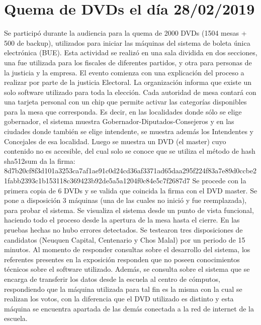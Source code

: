 \section{Quema de DVDs el día 28/02/2019}
Se participó durante la audiencia para la quema de 2000 DVDs (1504 mesas + 500 de backup), utilizados para iniciar las máquinas del sistema de boleta única electrónica (BUE). \newline
Esta actividad se realizó en una sala dividida en dos secciones, una fue utilizada para los fiscales de diferentes partidos, y otra para personas de la justicia y la empresa.  \newline
El evento comienza con una explicación del proceso a realizar por parte de la justicia Electoral.  La organización informa que existe un solo software utilizado para toda la elección. Cada autoridad de mesa contará con una tarjeta personal con un chip que permite activar las categorías disponibles para la mesa que corresponda. Es decir, en las localidades donde sólo se elige gobernador, el sistema muestra Gobernador-Diputados-Consejeros y en las ciudades donde también se elige intendente, se muestra además los Intendentes y Concejales de esa localidad. \newline
Luego se muestra un DVD (el master) cuyo contenido no es accesible, del cual solo se conoce que se utiliza el método de hash sha512sum da la firma: \newline
8d7b20cf8f3d101a3253ca7af1ae91c0d24cd36af3371ad65daa295f224f83a7e89d0ccbe21fabb2393c1b153118c369423b92de5a5a1204f0c84e5c7f2687d7  \newline
Se procede con la primera copia de 6 DVDs y se valida que coincida la firma con el DVD master.  
Se pone a disposición 3 máquinas (una de las cuales no inició y fue reemplazada), para probar el sistema. Se visualiza el sistema desde un punto de vista funcional, haciendo todo el proceso desde la apertura de la mesa hasta el cierre. En las pruebas hechas no hubo errores detectados. Se testearon tres disposiciones de candidatos (Neuquen Capital, Centenario y Chos Malal) por un periodo de 15 minutos. 
Al momento de responder consultas sobre el desarrollo del sistema, los referentes presentes en la exposición responden que no poseen conocimientos técnicos sobre el software utilizado. Además, se consulta sobre el sistema que se encarga de transferir los datos desde la escuela al centro de cómputos, respondiendo que la máquina utilizada para tal fin es la misma con la cual se realizan los votos, con la diferencia que el DVD utilizado es distinto y esta máquina se encuentra apartada de las demás conectada a la red de internet de la escuela. \newline
